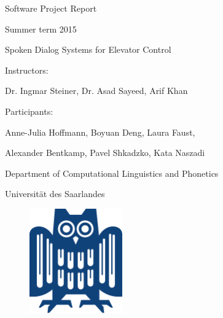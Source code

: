 
\begin{center} Software Project Report \end{center}
\begin{center} Summer term 2015 \end{center}
\hspace{1cm}
\begin{center}\Large{Spoken Dialog Systems for Elevator Control} \end{center}
\hspace{1cm}

\begin{center}Instructors:\end{center}
\begin{center}
Dr. Ingmar Steiner, Dr. Asad Sayeed, Arif Khan 
\end{center}

\vfill

\begin{center} Participants: \end{center}
\begin{center}
Anne-Julia Hoffmann, Boyuan Deng, Laura Faust, 
\end{center}
\begin{center}
Alexander Bentkamp, Pavel Shkadzko, Kata Naszadi
\end{center}

\vfill
\vfill

\begin{center} Department of Computational Linguistics and Phonetics \end{center}
\begin{center} Universität des Saarlandes \end{center}
\vfill
\begin{figure}[ht]
\begin{center}
  \includegraphics[width=4.0cm]{logo_uds.pdf}
\end{center}
\end{figure}
\vfill
\vfill
